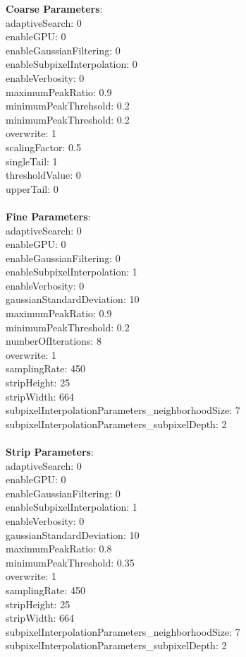 \documentclass[11pt]{article}
\begin{document}
\textbf{Coarse Parameters}: \\
adaptiveSearch: 0\\
enableGPU: 0\\
enableGaussianFiltering: 0\\
enableSubpixelInterpolation: 0\\
enableVerbosity: 0\\
maximumPeakRatio: 0.9\\
minimumPeakThrehsold: 0.2\\
minimumPeakThreshold: 0.2\\
overwrite: 1\\
scalingFactor: 0.5\\
singleTail: 1\\
thresholdValue: 0\\
upperTail: 0\\
\\
\textbf{Fine Parameters}: \\
adaptiveSearch: 0\\
enableGPU: 0\\
enableGaussianFiltering: 0\\
enableSubpixelInterpolation: 1\\
enableVerbosity: 0\\
gaussianStandardDeviation: 10\\
maximumPeakRatio: 0.9\\
minimumPeakThreshold: 0.2\\
numberOfIterations: 8\\
overwrite: 1\\
samplingRate: 450\\
stripHeight: 25\\
stripWidth: 664\\
subpixelInterpolationParameters\_neighborhoodSize: 7\\
subpixelInterpolationParameters\_subpixelDepth: 2\\
\\
\textbf{Strip Parameters}: \\
adaptiveSearch: 0\\
enableGPU: 0\\
enableGaussianFiltering: 0\\
enableSubpixelInterpolation: 1\\
enableVerbosity: 0\\
gaussianStandardDeviation: 10\\
maximumPeakRatio: 0.8\\
minimumPeakThreshold: 0.35\\
overwrite: 1\\
samplingRate: 450\\
stripHeight: 25\\
stripWidth: 664\\
subpixelInterpolationParameters\_neighborhoodSize: 7\\
subpixelInterpolationParameters\_subpixelDepth: 2\\
\\
\newpage
\end{document}
